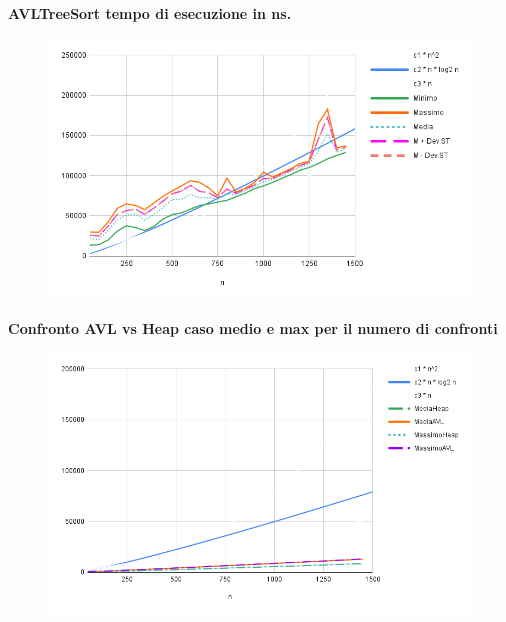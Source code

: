 \documentclass{article}
\begin{document}
 \vspace*{1 cm}
\begin{center}
    \Large \textbf{AVLTreeSort tempo di esecuzione in ns.}
    \begin{figure}[h]
        \centering
        \vspace*{-0.1 cm}
        \includegraphics[width=0.95\linewidth]{Grafici/AVLTreeSortTempNs.png}
        \label{fig:graph}
    \end{figure}
\end{center}


\newpage
\vspace*{-2.9 cm}
\begin{center}
    \Large \textbf{Confronto AVL vs Heap caso medio e max per il numero di confronti}
    \begin{figure}[h]
        \centering
        \includegraphics[width=0.95\linewidth]{Grafici/AVLvsHEApNc.png}
        \label{fig:graph}
    \end{figure}
\end{center}
\end{document}

